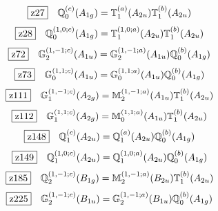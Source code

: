 \documentclass[fleqn,10pt,landscape]{jsarticle}
\begin{document}
\begin{dmath*}
\hspace*{3mm}\fbox{z27}\quad \mathbb{Q}_{0}^{(c)}(A_{1g})=\mathbb{T}_{1}^{(a)}(A_{2u}) \mathbb{T}_{1}^{(b)}(A_{2u})
\end{dmath*}
\begin{dmath*}
\hspace*{3mm}\fbox{z28}\quad \mathbb{Q}_{0}^{(1,0;c)}(A_{1g})=\mathbb{T}_{1}^{(1,0;a)}(A_{2u}) \mathbb{T}_{1}^{(b)}(A_{2u})
\end{dmath*}
\begin{dmath*}
\hspace*{3mm}\fbox{z72}\quad \mathbb{G}_{2}^{(1,-1;c)}(A_{1u})=\mathbb{G}_{2}^{(1,-1;a)}(A_{1u}) \mathbb{Q}_{0}^{(b)}(A_{1g})
\end{dmath*}
\begin{dmath*}
\hspace*{3mm}\fbox{z73}\quad \mathbb{G}_{0}^{(1,1;c)}(A_{1u})=\mathbb{G}_{0}^{(1,1;a)}(A_{1u}) \mathbb{Q}_{0}^{(b)}(A_{1g})
\end{dmath*}
\begin{dmath*}
\hspace*{3mm}\fbox{z111}\quad \mathbb{G}_{1}^{(1,-1;c)}(A_{2g})=\mathbb{M}_{2}^{(1,-1;a)}(A_{1u}) \mathbb{T}_{1}^{(b)}(A_{2u})
\end{dmath*}
\begin{dmath*}
\hspace*{3mm}\fbox{z112}\quad \mathbb{G}_{1}^{(1,1;c)}(A_{2g})=\mathbb{M}_{0}^{(1,1;a)}(A_{1u}) \mathbb{T}_{1}^{(b)}(A_{2u})
\end{dmath*}
\begin{dmath*}
\hspace*{3mm}\fbox{z148}\quad \mathbb{Q}_{1}^{(c)}(A_{2u})=\mathbb{Q}_{1}^{(a)}(A_{2u}) \mathbb{Q}_{0}^{(b)}(A_{1g})
\end{dmath*}
\begin{dmath*}
\hspace*{3mm}\fbox{z149}\quad \mathbb{Q}_{1}^{(1,0;c)}(A_{2u})=\mathbb{Q}_{1}^{(1,0;a)}(A_{2u}) \mathbb{Q}_{0}^{(b)}(A_{1g})
\end{dmath*}
\begin{dmath*}
\hspace*{3mm}\fbox{z185}\quad \mathbb{Q}_{2}^{(1,-1;c)}(B_{1g})=\mathbb{M}_{2}^{(1,-1;a)}(B_{2u}) \mathbb{T}_{1}^{(b)}(A_{2u})
\end{dmath*}
\begin{dmath*}
\hspace*{3mm}\fbox{z225}\quad \mathbb{G}_{2}^{(1,-1;c)}(B_{1u})=\mathbb{G}_{2}^{(1,-1;a)}(B_{1u}) \mathbb{Q}_{0}^{(b)}(A_{1g})
\end{dmath*}
\end{document}
